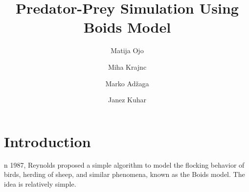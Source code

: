 \documentclass[9pt]{pnas-new}
\title{Predator-Prey Simulation Using Boids Model}
\author{Matija Ojo}
\author{Miha Krajnc}
\author{Marko Adžaga}
\author{Janez Kuhar}
\affil{Collective behaviour course research seminar report}
\begin{document}
\verticaladjustment{-2pt}

\maketitle
\thispagestyle{firststyle}

\section*{Introduction}

n 1987, Reynolds \cite{reynolds1987flocks} proposed a simple algorithm to model the
flocking behavior of birds, herding of sheep, and similar phenomena, known as the Boids model.
The idea is relatively simple.
\end{document}

